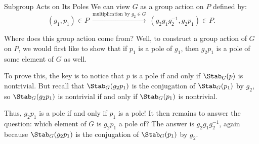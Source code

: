 \begin{theorem}{Subgroup Acts on Its Poles}
    We can view $G$ as a group action on $P$ defined by:
    \[ (g_1, p_1) \in P ~ \xrightarrow{\text{multiplication by }  g_2 \in G} ~ (g_2g_1g_2^{-1}, g_2p_1) \in P. \]
\end{theorem} \vspace{-1cm}

\begin{remark}
    Where does this group action come from?  Well, to construct a group action of $G$ on $P$, we would first like to show that if $p_1$ is a pole of $g_1$, then $g_2p_1$ is a pole of some element of $G$ as well.

    To prove this, the key is to notice that $p$ is a pole if and only if $\Stab_G(p)$ is nontrivial.  But recall that $\Stab_G(g_2p_1)$ is the conjugation of $\Stab_G(p_1)$ by $g_2$, so $\Stab_G(g_2p_1)$ is nontrivial if and only if $\Stab_G(p_1)$ is nontrivial.

    Thus, $g_2p_1$ is a pole if and only if $p_1$ is a pole!  It then remains to answer the question: which element of $G$ is $g_2p_1$ a pole of?  The answer is $g_2g_1g_2^{-1}$, again because $\Stab_G(g_2p_1)$ is the conjugation of $\Stab_G(p_1)$ by $g_2$.
\end{remark}

